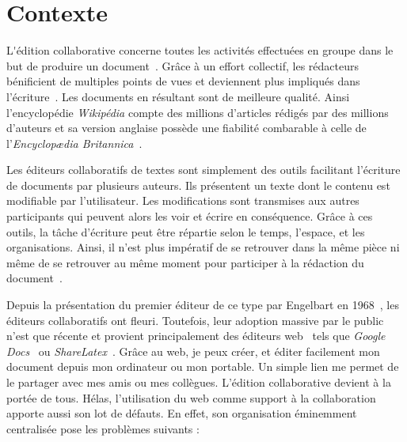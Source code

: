 
\section{Contexte}

\lettrine{L}'édition collaborative concerne toutes les activités effectuées en
groupe dans le but de produire un document~\cite{ellis1989concurrency,
  johansen1988groupware}. Grâce à un effort collectif, les rédacteurs
bénificient de multiples points de vues et deviennent plus impliqués dans
l'écriture~\cite{noel2004empirical}. Les documents en résultant sont de
meilleure qualité. Ainsi l'encyclopédie \emph{Wikipédia} compte des millions
d'articles rédigés par des millions d'auteurs et sa version anglaise possède une
fiabilité combarable à celle de l'\emph{Encyclopædia
  Britannica}~\cite{giles2005internet}.

Les éditeurs collaboratifs de textes sont simplement des outils facilitant
l'écriture de documents par plusieurs auteurs. Ils présentent un texte dont le
contenu est modifiable par l'utilisateur. Les modifications sont transmises aux
autres participants qui peuvent alors les voir et écrire en conséquence. Grâce à
ces outils, la tâche d'écriture peut être répartie selon le temps, l'espace, et
les organisations. Ainsi, il n'est plus impératif de se retrouver dans la même
pièce ni même de se retrouver au même moment pour participer à la rédaction du
document~\cite{johansen1988groupware}.

Depuis la présentation du premier éditeur de ce type par Engelbart en
1968~\cite{engelbart1968research}, les éditeurs collaboratifs ont
fleuri. Toutefois, leur adoption massive par le public n'est que récente et
provient principalement des éditeurs web~\cite{mogan2010impact,
  perkel2014scientific} tels que \emph{Google Docs}~\cite{googledocs} ou
\emph{ShareLatex}~\cite{sharelatex}. Grâce au web, je peux créer, et éditer
facilement mon document depuis mon ordinateur ou mon portable. Un simple lien me
permet de le partager avec mes amis ou mes collègues. L'édition collaborative
devient à la portée de tous. Hélas, l'utilisation du web comme support à la
collaboration apporte aussi son lot de défauts. En effet, son organisation
éminemment centralisée pose les problèmes suivants :

